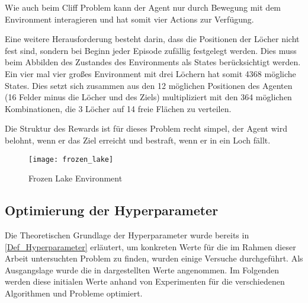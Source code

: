 \begin{enumerate}
    Wie auch beim Cliff Problem kann der Agent nur durch Bewegung mit dem Environment interagieren und hat somit vier Actions zur Verfügung.

    Eine weitere Herausforderung besteht darin, dass die Positionen der Löcher nicht fest sind, sondern bei Beginn jeder Episode zufällig festgelegt werden. Dies muss beim Abbilden des Zustandes des Environments als States berücksichtigt werden. Ein vier mal vier großes Environment mit drei Löchern hat somit 4368 mögliche States. Dies setzt sich zusammen aus den 12 möglichen Positionen des Agenten (16 Felder minus die Löcher und des Ziels) multipliziert mit den 364 möglichen Kombinationen, die 3 Löcher auf 14 freie Flächen zu verteilen.

    Die Struktur des Rewards ist für dieses Problem recht simpel, der Agent wird belohnt, wenn er das Ziel erreicht und bestraft, wenn er in ein Loch fällt.
    
    \begin{figure}
        \centering
        \texttt{[image: frozen\_lake]}
        \caption{Frozen Lake Environment}
        \label{fig:frozen_env}
    \end{figure}


\end{enumerate}

\subsection{Optimierung der Hyperparameter}
Die Theoretischen Grundlage der Hyperparameter wurde bereits in \ref*{Def_Hyperparameter}  erläutert, um konkreten Werte für die im Rahmen dieser Arbeit untersuchten Problem zu finden, wurden einige Versuche durchgeführt. 
Als Ausgangslage wurde die in  dargestellten Werte angenommen. Im Folgenden werden diese initialen Werte anhand von Experimenten für die verschiedenen Algorithmen und Probleme optimiert.

